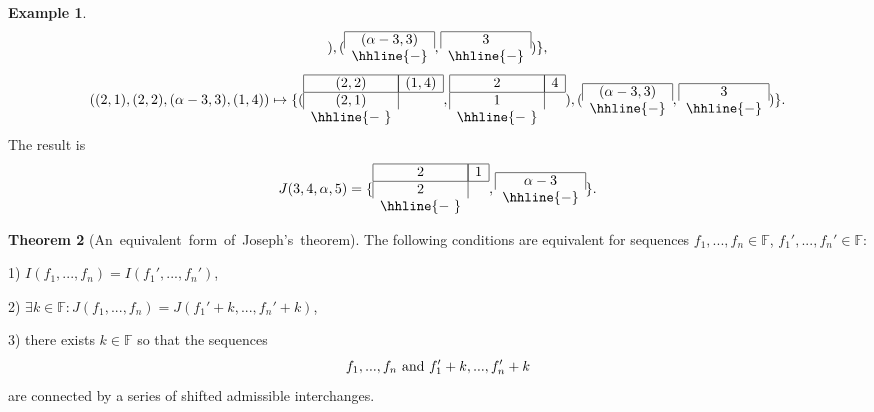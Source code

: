 \documentclass[10pt]{amsart}\oddsidemargin -1mm \evensidemargin -1mm \topmargin -15mm\headheight5mm \headsep 3.5mm \textheight 245mm\textwidth 170mm
\theoremstyle{definition}\newtheorem{theorem}{Theorem}[section]\newtheorem{lemma}[theorem]{Lemma}\newtheorem{remark}[theorem]{Remark}\newtheorem{proposition}[theorem]{Proposition}\newtheorem{corollary}[theorem]{Corollary}\newtheorem{definition}[theorem]{Definition}\newtheorem{Ex}[theorem]{Example}\newtheorem{obs}[theorem]{Observation}\newtheorem{nota}[theorem]{Notation}
\begin{document}
\begin{Ex}
$$\begin{array}{cc}
\end{array}),  
(\begin{array}{c}
\hline\multicolumn{1}{|c|}{(\alpha-3, 3)}\\
\hhline{-}
\end{array},
\begin{array}{c}
\hline\multicolumn{1}{|c|}{3}\\
\hhline{-}
\end{array})
\},
$$
$$((2, 1), (2, 2), (\alpha-3, 3), (1, 4))\mapsto\{(\begin{array}{cc}
\hline\multicolumn{1}{|c|}{(2, 2)}&\multicolumn{1}{|c|}{(1, 4)}\\
\hline\multicolumn{1}{|c|}{(2, 1)}&\\
\hhline{-~}
\end{array}, 
\begin{array}{cc}
\hline\multicolumn{1}{|c|}{2}&\multicolumn{1}{|c|}{4}\\
\hline\multicolumn{1}{|c|}{1}&\\
\hhline{-~}
\end{array}), 
(\begin{array}{c}
\hline\multicolumn{1}{|c|}{(\alpha-3, 3)}\\
\hhline{-}
\end{array}, 
\begin{array}{c}
\hline\multicolumn{1}{|c|}{3}\\
\hhline{-}
\end{array})\}.
$$
The result is
$$J(3, 4, \alpha, 5)=\{\begin{array}{cc}
\hline\multicolumn{1}{|c|}{2}&\multicolumn{1}{|c|}{1}\\
\hline\multicolumn{1}{|c|}{2}&\\
\hhline{-~}
\end{array}, \begin{array}{c}
\hline\multicolumn{1}{|c|}{\alpha-3}\\
\hhline{-}
\end{array}\}.
$$
\end{Ex}
\begin{theorem}[{An~equivalent~form~of~Joseph's~theorem}]\label{Tjo}The following conditions are equivalent for sequences $f_1,..., f_n\in\mathbb F$, $f_1',..., f_n'\in\mathbb F$:

1) $I(f_1,..., f_n)=I(f_1',..., f_n')$,

2) $\exists k\in\mathbb F: J(f_1,..., f_n)=J(f_1'+k,..., f_n'+k)$,

3) there exists $k\in\mathbb F$ so that the sequences $$f_1,..., f_n{\rm~and~}f_1'+k,..., f_n'+k$$ are connected by a series of shifted admissible interchanges.\end{theorem}
\end{document}
